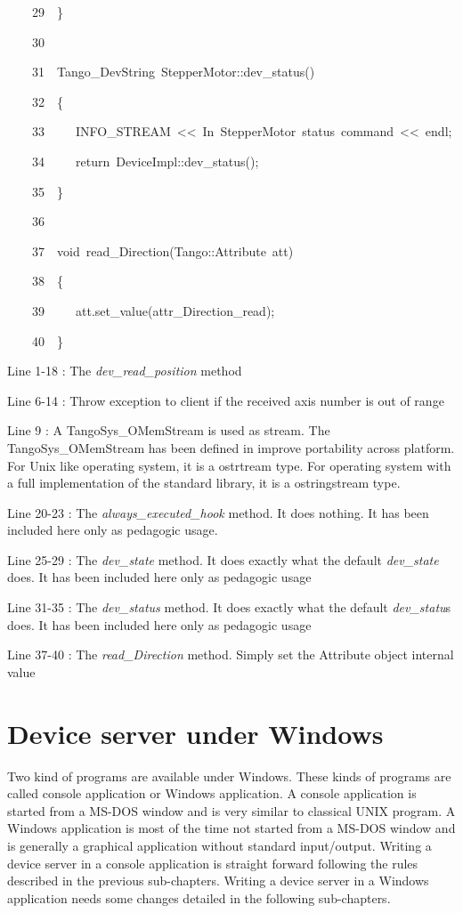 \begin{lyxcode}
~~~~29~~\}

~~~~30~~

~~~~31~~Tango\_DevString~StepperMotor::dev\_status()

~~~~32~~\{

~~~~33~~~~~INFO\_STREAM~<\textcompwordmark{}<~\textquotedbl{}In~StepperMotor~status~command\textquotedbl{}~<\textcompwordmark{}<~endl;

~~~~34~~~~~return~DeviceImpl::dev\_status();

~~~~35~~\}

~~~~36~~

~~~~37~~void~read\_Direction(Tango::Attribute~att)

~~~~38~~\{

~~~~39~~~~~att.set\_value(attr\_Direction\_read);

~~~~40~~\}
\end{lyxcode}


Line 1-18 : The \emph{dev\_read\_position} method

Line 6-14 : Throw exception to client if the received axis number
is out of range

Line 9 : A TangoSys\_OMemStream is used as stream. The TangoSys\_OMemStream
has been defined in improve portability across platform. For Unix
like operating system, it is a ostrtream type. For operating system
with a full implementation of the standard library, it is a ostringstream
type.

Line 20-23 : The \emph{always\_executed\_hook} method. It does nothing.
It has been included here only as pedagogic usage.

Line 25-29 : The \emph{dev\_state} method. It does exactly what the
default \emph{dev\_state} does. It has been included here only as
pedagogic usage

Line 31-35 : The \emph{dev\_status} method. It does exactly what the
default \emph{dev\_statu}s does. It has been included here only as
pedagogic usage

Line 37-40 : The \emph{read\_Direction} method. Simply set the Attribute
object internal value

\section{Device server under Windows}

Two kind of programs are available under Windows.
These kinds of programs are called console application
or Windows application. A console application is started from a MS-DOS
window and is very similar to classical UNIX program. A Windows application
is most of the time not started from a MS-DOS window and is generally
a graphical application without standard input/output. Writing a device
server in a console application is straight forward following the
rules described in the previous sub-chapters. Writing a device server
in a Windows application needs some changes detailed in the following
sub-chapters.

